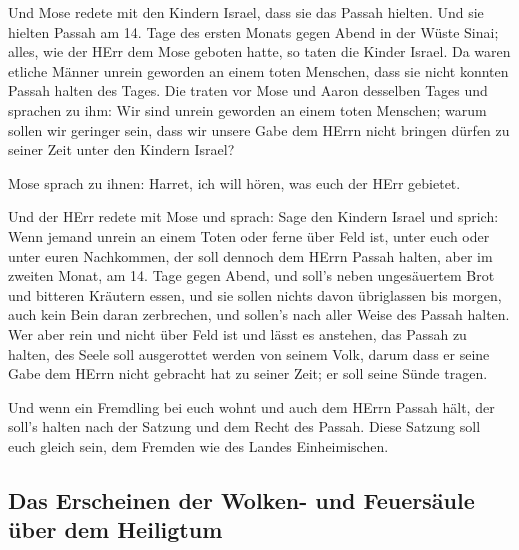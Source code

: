  Und Mose redete mit den Kindern Israel, dass sie das
Passah hielten.  Und sie hielten Passah am 14. Tage des
ersten Monats gegen Abend in der Wüste Sinai; alles, wie der HErr dem
Mose geboten hatte, so taten die Kinder Israel.  Da waren
etliche Männer unrein geworden an einem toten Menschen, dass sie nicht
konnten Passah halten des Tages. Die traten vor Mose und Aaron desselben
Tages  und sprachen zu ihm: Wir sind unrein geworden an
einem toten Menschen; warum sollen wir geringer sein, dass wir unsere
Gabe dem HErrn nicht bringen dürfen zu seiner Zeit unter den Kindern
Israel?

 Mose sprach zu ihnen: Harret, ich will hören, was euch
der HErr gebietet.

 Und der HErr redete mit Mose und sprach: 
Sage den Kindern Israel und sprich: Wenn jemand unrein an einem Toten
oder ferne über Feld ist, unter euch oder unter euren Nachkommen, der
soll dennoch dem HErrn Passah halten,  aber im zweiten
Monat, am 14. Tage gegen Abend, und soll's neben ungesäuertem Brot und
bitteren Kräutern essen,  und sie sollen nichts davon
übriglassen bis morgen, auch kein Bein daran zerbrechen, und sollen's
nach aller Weise des Passah halten.  Wer aber rein und
nicht über Feld ist und lässt es anstehen, das Passah zu halten, des
Seele soll ausgerottet werden von seinem Volk, darum dass er seine Gabe
dem HErrn nicht gebracht hat zu seiner Zeit; er soll seine Sünde tragen.

 Und wenn ein Fremdling bei euch wohnt und auch dem HErrn
Passah hält, der soll's halten nach der Satzung und dem Recht des
Passah. Diese Satzung soll euch gleich sein, dem Fremden wie des Landes
Einheimischen.

\hypertarget{das-erscheinen-der-wolken--und-feuersuxe4ule-uxfcber-dem-heiligtum}{%
\subsection{Das Erscheinen der Wolken- und Feuersäule über dem
Heiligtum}\label{das-erscheinen-der-wolken--und-feuersuxe4ule-uxfcber-dem-heiligtum}}

